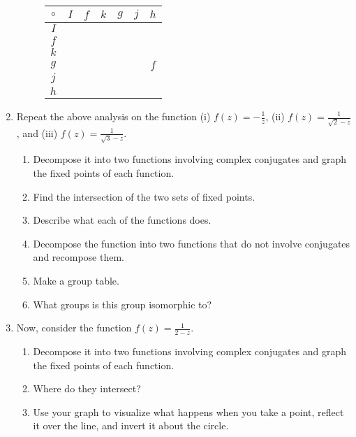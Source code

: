 \documentclass[../textbook.tex]{subfiles}
\begin{document}
\begin{enumerate}
\begin{figure}[h]
\begin{center}
\begin{minipage}[c]{0.35\textwidth}
			\begin{center}
				\begin{minipage}[b]{\textwidth}
					\centering
					\begin{tabular}{c|cccccc}
						\hline
						$\circ$ & $I$ & $f$ & $k$ & $g$ & $j$ & $h$ \\ \hline
						\rowcolor{light-gray}
						$I$ & & & & & & \\
						$f$ & & & & & & \\
						\rowcolor{light-gray}
						$k$ & & & & & & \\
						$g$ & & & & & & $f$\\
						\rowcolor{light-gray}
						$j$ & & & & & & \\
						$h$ & & & & & & \\ \hline
					\end{tabular}
				\end{minipage}
			\end{center}
		\end{minipage}
	\end{center}
	\vspace*{-2\baselineskip}
\end{figure}
\item Repeat the above analysis on the function (i) $f(z)=-\frac{1}{z}$, (ii) $f(z)=\frac{1}{\sqrt{2}-z}$, and (iii) $f(z)=\frac{1}{\sqrt{3}-z}$.
\begin{enumerate}
\item Decompose it into two functions involving complex conjugates and graph the fixed points of each function.
\item Find the intersection of the two sets of fixed points.
\item Describe what each of the functions does.
\item Decompose the function into two functions that do not involve conjugates and recompose them.
\item Make a group table.
\item What groups is this group isomorphic to?
\end{enumerate}
\item Now, consider the function $f(z)=\frac{1}{2-z}$.
\begin{enumerate}
\item Decompose it into two functions involving complex conjugates and graph the fixed points of each function.
\item Where do they intersect?
\item Use your graph to visualize what happens when you take a point, reflect it over the line, and invert it about the circle.

\end{enumerate}
\end{enumerate}
\end{document}
